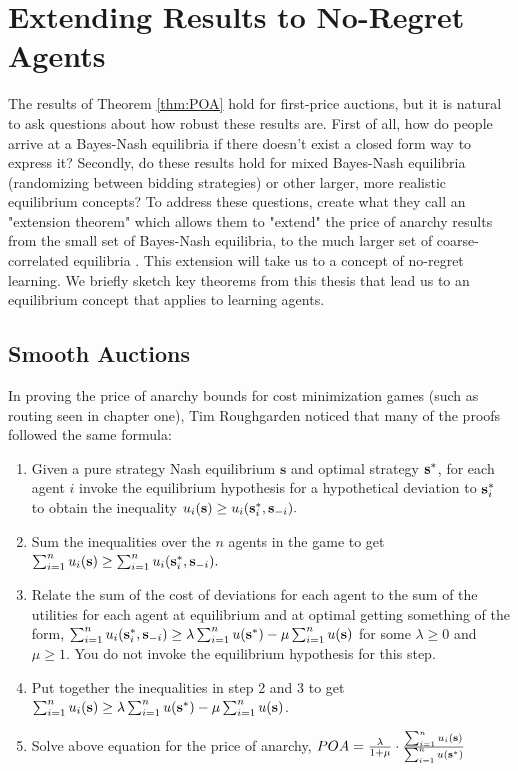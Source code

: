 \documentclass[12pt,twoside]{reedthesis}
\begin{document}
\section{Extending Results to No-Regret Agents}
The results of Theorem \ref{thm:POA} hold for first-price auctions, but it is natural to ask questions about how robust these results are. First of all, how do people arrive at a Bayes-Nash equilibria if there doesn't exist a closed form way to express it? Secondly, do these results hold for mixed Bayes-Nash equilibria (randomizing between bidding strategies) or other larger, more realistic equilibrium concepts? To address these questions, \cite{Roughgarden2017} create what they call an "extension theorem" which allows them to "extend" the price of anarchy results from the small set of Bayes-Nash equilibria, to the much larger set of coarse-correlated equilibria  \citep[p.~60]{Roughgarden2017}.  This extension will take us to a concept of no-regret learning. We briefly sketch key theorems from this thesis that lead us to an equilibrium concept that applies to learning agents.


\subsection{Smooth Auctions}

In proving the price of anarchy bounds for cost minimization games (such as routing seen in chapter one), Tim Roughgarden noticed that many of the proofs followed the same formula:

\begin{enumerate}
	\item Given a pure strategy Nash equilibrium $\textbf{s}$ and optimal strategy $\textbf{s}^{*}$, for each agent $i$ invoke the equilibrium hypothesis for a hypothetical deviation to $\textbf{s}^*_i$ to obtain the inequality $u_i(\textbf{s}) \geq u_i(\textbf{s}_i^*,\textbf{s}_{-i}).$
	
	\item Sum the inequalities over the $n$ agents in the game to get $\sum_{i=1}^{n}u_i(\textbf{s}) \geq \sum_{i=1}^{n}u_i(\textbf{s}_i^*,\textbf{s}_{-i}).$
	
	
	\item Relate the sum of the cost of deviations for each agent to the sum of the utilities for each agent at equilibrium and at optimal getting something of the form, $\sum_{i=1}^{n}u_i(\textbf{s}_i^*,\textbf{s}_{-i}) \geq \lambda \sum_{i=1}^{n}u(\textbf{s}^*) - \mu \sum_{i=1}^{n}u(\textbf{s})$ for some $\lambda \geq 0$ and $\mu \geq 1$. You do not invoke the equilibrium hypothesis for this step.
	
	\item Put together the inequalities in step 2 and 3 to get $\sum_{i=1}^{n}u_i(\textbf{s}) \geq \lambda \sum_{i=1}^{n}u(\textbf{s}^*) - \mu \sum_{i=1}^{n}u(\textbf{s})$.
	
	\item Solve above equation for the price of anarchy, $POA =  \frac{\lambda}{1 + \mu} \cdot \frac{\sum_{i=1}^{n}u_i(\textbf{s})}{\sum_{i=1}^{n}u(\textbf{s}^*)}$
\end{enumerate}
\end{document}
